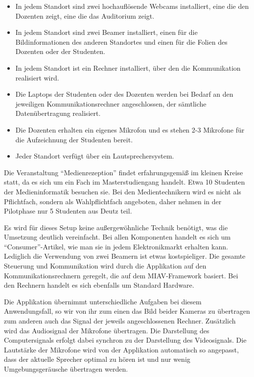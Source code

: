 \begin{itemize}

	\item In jedem Standort sind zwei hochauflösende Webcams installiert, eine die den Dozenten zeigt, eine die das Auditorium zeigt.
	\item In jedem Standort sind zwei Beamer installiert, einen für die Bildinformationen des anderen Standortes und einen für die Folien des Dozenten oder der Studenten.
	\item In jedem Standort ist ein Rechner installiert, über den die Kommunikation realisiert wird.
	\item Die Laptops der Studenten oder des Dozenten werden bei Bedarf an den jeweiligen Kommunikationsrechner angeschlossen, der sämtliche Datenübertragung realisiert.
	\item Die Dozenten erhalten ein eigenes Mikrofon und es stehen 2-3 Mikrofone für die Aufzeichnung der Studenten bereit.
	\item Jeder Standort verfügt über ein Lautsprechersystem.

\end{itemize}

Die Veranstaltung "`Medienrezeption"' findet erfahrungsgemäß im kleinen Kreise statt, da es sich um ein Fach im Masterstudiengang handelt. Etwa 10 Studenten der Medieninformatik besuchen sie. Bei den Medientechnikern wird es nicht als Pflichtfach, sondern als Wahlpflichtfach angeboten, daher nehmen in der Pilotphase nur 5 Studenten aus Deutz teil.

Es wird für dieses Setup keine außergewöhnliche Technik benötigt, was die Umsetzung deutlich vereinfacht. Bei allen Komponenten handelt es sich um "`Consumer"'-Artikel, wie man sie in jedem Elektronikmarkt erhalten kann. Lediglich die Verwendung von zwei Beamern ist etwas kostspieliger. Die gesamte Steuerung und Kommunikation wird durch die Applikation auf den Kommunikationsrechnern geregelt, die auf dem MIAV-Framework basiert. Bei den Rechnern handelt es sich ebenfalls um Standard Hardware.

Die Applikation übernimmt unterschiedliche Aufgaben bei diesem Anwendungsfall, so wir von ihr zum einen das Bild beider Kameras zu übertragen zum anderen auch das Signal der jeweils angeschlossenen Rechner. Zusätzlich wird das Audiosignal der Mikrofone übertragen. Die Darstellung des Computersignals erfolgt dabei synchron zu der Darstellung des Videosignals. Die Lautstärke der Mikrofone wird von der Applikation automatisch so angepasst, dass der aktuelle Sprecher optimal zu hören ist und nur wenig Umgebungsgeräusche übertragen werden.

